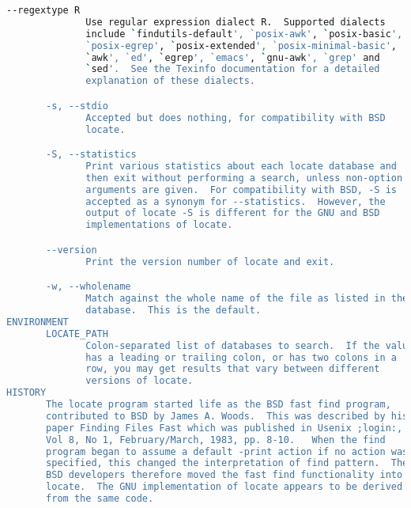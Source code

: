 {{\begin{lstlisting}[language=bash]
       --regextype R
              Use regular expression dialect R.  Supported dialects
              include `findutils-default', `posix-awk', `posix-basic',
              `posix-egrep', `posix-extended', `posix-minimal-basic',
              `awk', `ed', `egrep', `emacs', `gnu-awk', `grep' and
              `sed'.  See the Texinfo documentation for a detailed
              explanation of these dialects.

       -s, --stdio
              Accepted but does nothing, for compatibility with BSD
              locate.

       -S, --statistics
              Print various statistics about each locate database and
              then exit without performing a search, unless non-option
              arguments are given.  For compatibility with BSD, -S is
              accepted as a synonym for --statistics.  However, the
              output of locate -S is different for the GNU and BSD
              implementations of locate.

       --version
              Print the version number of locate and exit.

       -w, --wholename
              Match against the whole name of the file as listed in the
              database.  This is the default.
ENVIRONMENT
       LOCATE_PATH
              Colon-separated list of databases to search.  If the value
              has a leading or trailing colon, or has two colons in a
              row, you may get results that vary between different
              versions of locate.
HISTORY
       The locate program started life as the BSD fast find program,
       contributed to BSD by James A. Woods.  This was described by his
       paper Finding Files Fast which was published in Usenix ;login:,
       Vol 8, No 1, February/March, 1983, pp. 8-10.   When the find
       program began to assume a default -print action if no action was
       specified, this changed the interpretation of find pattern.  The
       BSD developers therefore moved the fast find functionality into
       locate.  The GNU implementation of locate appears to be derived
       from the same code.


\end{lstlisting}}}
